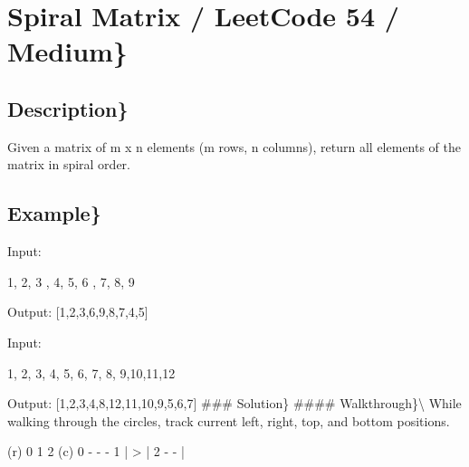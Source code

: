 \documentclass[]{book}
\newenvironment{Shaded}{\begin{snugshade}}{\end{snugshade}}
\newcommand{\DecValTok}[1]{\textcolor[rgb]{0.00,0.00,0.81}{#1}}
\newcommand{\NormalTok}[1]{#1}
\begin{document}
\hypertarget{spiral-matrix-leetcode-54-medium}{%
\section{Spiral Matrix / LeetCode 54 / Medium\}}\label{spiral-matrix-leetcode-54-medium}}

\hypertarget{description-42}{%
\subsection{Description\}}\label{description-42}}

Given a matrix of m x n elements (m rows, n columns), return all elements of the matrix in spiral order.

\hypertarget{example-41}{%
\subsection{Example\}}\label{example-41}}

Input:

\begin{Shaded}
\begin{Highlighting}[]
\DecValTok{1}\NormalTok{, }\DecValTok{2}\NormalTok{, }\DecValTok{3}\NormalTok{ ,}
\DecValTok{4}\NormalTok{, }\DecValTok{5}\NormalTok{, }\DecValTok{6}\NormalTok{ ,}
\DecValTok{7}\NormalTok{, }\DecValTok{8}\NormalTok{, }\DecValTok{9}
\end{Highlighting}
\end{Shaded}

Output: {[}1,2,3,6,9,8,7,4,5{]}

Input:

\begin{Shaded}
\begin{Highlighting}[]
\DecValTok{1}\NormalTok{, }\DecValTok{2}\NormalTok{, }\DecValTok{3}\NormalTok{, }\DecValTok{4}\NormalTok{,}
\DecValTok{5}\NormalTok{, }\DecValTok{6}\NormalTok{, }\DecValTok{7}\NormalTok{, }\DecValTok{8}\NormalTok{,}
\DecValTok{9}\NormalTok{,}\DecValTok{10}\NormalTok{,}\DecValTok{11}\NormalTok{,}\DecValTok{12}
\end{Highlighting}
\end{Shaded}

Output: {[}1,2,3,4,8,12,11,10,9,5,6,7{]}
\#\#\# Solution\}
\#\#\#\# Walkthrough\}\textbackslash{}
While walking through the circles, track current left, right, top, and bottom positions.

\begin{Shaded}
\begin{Highlighting}[]
\NormalTok{(r)}
    \DecValTok{0}  \DecValTok{1}  \DecValTok{2}\NormalTok{   (c)}
 \DecValTok{0}\NormalTok{  -  -  -}
 \DecValTok{1}\NormalTok{  |  >  |}
 \DecValTok{2}\NormalTok{  -  -  |}
\end{Highlighting}
\end{Shaded}
\end{document}
